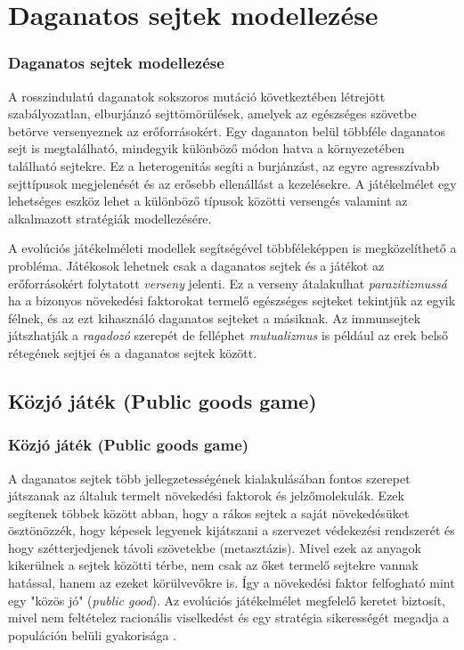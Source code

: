 \section{Daganatos sejtek modellezése}
\begin{frame}
\frametitle{Daganatos sejtek modellezése}
A rosszindulatú daganatok sokszoros mutáció következtében létrejött szabályozatlan, elburjánzó sejttömörülések, amelyek az egészséges szövetbe betörve versenyeznek az erőforrásokért. Egy daganaton belül többféle daganatos sejt is megtalálható, mindegyik különböző módon hatva a környezetében található sejtekre. Ez a heterogenitás segíti a burjánzást, az egyre agresszívabb sejttípusok megjelenését és az erősebb ellenállást a kezelésekre. A játékelmélet egy lehetséges eszköz lehet a különböző típusok közötti versengés valamint az alkalmazott stratégiák modellezésére.

A evolúciós játékelméleti modellek segítségével többféleképpen is megközelíthető a probléma. Játékosok lehetnek csak a daganatos sejtek és a játékot az erőforrásokért folytatott \textit{verseny} jelenti. Ez a verseny átalakulhat \textit{parazitizmussá} ha a bizonyos növekedési faktorokat termelő egészséges sejteket tekintjük az egyik félnek, és az ezt kihasználó daganatos sejteket a másiknak. Az immunsejtek játszhatják a \textit{ragadozó} szerepét de felléphet \textit{mutualizmus} is például az erek belső rétegének sejtjei és a daganatos sejtek között. 
\end{frame}

\subsection{Közjó játék (Public goods game)}
\begin{frame}
\frametitle{Közjó játék (Public goods game)}
A daganatos sejtek több jellegzetességének kialakulásában fontos szerepet játszanak az általuk termelt növekedési faktorok és jelzőmolekulák. Ezek segítenek többek között abban, hogy a rákos sejtek a saját növekedésüket ösztönözzék, hogy képesek legyenek kijátszani a szervezet védekezési rendszerét és hogy szétterjedjenek távoli szövetekbe (metasztázis). Mivel ezek az anyagok kikerülnek a sejtek közötti térbe, nem csak az őket termelő sejtekre vannak hatással, hanem az ezeket körülvevőkre is. Így a növekedési faktor felfogható mint egy "közös jó" (\textit{public good}). Az evolúciós játékelmélet megfelelő keretet biztosít, mivel nem feltételez racionális viselkedést és egy stratégia sikerességét megadja a populáción belüli gyakorisága \cite{archetti2016cooperation}.
\end{frame}

